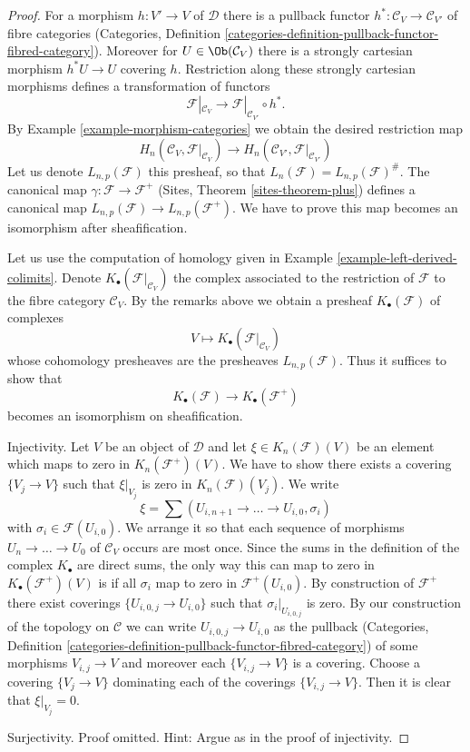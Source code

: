 \begin{proof}
For a morphism $h : V' \to V$ of $\mathcal{D}$ there is a
pullback functor $h^* : \mathcal{C}_V \to \mathcal{C}_{V'}$ of fibre
categories (Categories, Definition
\ref{categories-definition-pullback-functor-fibred-category}).
Moreover for $U \in \Ob(\mathcal{C}_V)$ there is a
strongly cartesian morphism $h^*U \to U$ covering $h$.
Restriction along these strongly cartesian morphisms defines a
transformation of functors
$$
\mathcal{F}|_{\mathcal{C}_V}
\longrightarrow
\mathcal{F}|_{\mathcal{C}_{V'}} \circ h^*.
$$
By Example \ref{example-morphism-categories}
we obtain the desired restriction map
$$
H_n(\mathcal{C}_V, \mathcal{F}|_{\mathcal{C}_V})
\longrightarrow
H_n(\mathcal{C}_{V'}, \mathcal{F}|_{\mathcal{C}_{V'}})
$$
Let us denote $L_{n, p}(\mathcal{F})$ this presheaf, so that
$L_n(\mathcal{F}) = L_{n, p}(\mathcal{F})^\#$.
The canonical map $\gamma : \mathcal{F} \to \mathcal{F}^+$
(Sites, Theorem \ref{sites-theorem-plus})
defines a canonical
map $L_{n, p}(\mathcal{F}) \to L_{n, p}(\mathcal{F}^+)$.
We have to prove this map becomes an isomorphism after sheafification.

\medskip\noindent
Let us use the computation of homology given in
Example \ref{example-left-derived-colimits}. Denote
$K_\bullet(\mathcal{F}|_{\mathcal{C}_V})$ the complex associated to
the restriction of $\mathcal{F}$ to the fibre category $\mathcal{C}_V$.
By the remarks above we obtain a presheaf $K_\bullet(\mathcal{F})$
of complexes
$$
V \longmapsto K_\bullet(\mathcal{F}|_{\mathcal{C}_V})
$$
whose cohomology presheaves are the presheaves $L_{n, p}(\mathcal{F})$.
Thus it suffices to show that
$$
K_\bullet(\mathcal{F}) \longrightarrow K_\bullet(\mathcal{F}^+)
$$
becomes an isomorphism on sheafification.

\medskip\noindent
Injectivity. Let $V$ be an object of $\mathcal{D}$ and let
$\xi \in K_n(\mathcal{F})(V)$ be an element which maps
to zero in $K_n(\mathcal{F}^+)(V)$. We have to show there exists a
covering $\{V_j \to V\}$ such that $\xi|_{V_j}$ is zero in
$K_n(\mathcal{F})(V_j)$. We write
$$
\xi = \sum (U_{i, n + 1} \to \ldots \to U_{i, 0}, \sigma_i)
$$
with $\sigma_i \in \mathcal{F}(U_{i, 0})$. We arrange it so that
each sequence of morphisms $U_n \to \ldots \to U_0$ of $\mathcal{C}_V$
occurs are most once. Since the sums in the definition
of the complex $K_\bullet$ are direct sums, the only way this can map
to zero in $K_\bullet(\mathcal{F}^+)(V)$ is if all $\sigma_i$ map
to zero in $\mathcal{F}^+(U_{i, 0})$. By construction of
$\mathcal{F}^+$ there exist coverings $\{U_{i, 0, j} \to U_{i, 0}\}$
such that $\sigma_i|_{U_{i, 0, j}}$ is zero. By our construction of
the topology on $\mathcal{C}$ we can write $U_{i, 0, j} \to U_{i, 0}$
as the pullback (Categories, Definition
\ref{categories-definition-pullback-functor-fibred-category})
of some morphisms $V_{i, j} \to V$ and moreover each
$\{V_{i, j} \to V\}$ is a covering. Choose a covering
$\{V_j \to V\}$ dominating each of the coverings $\{V_{i, j} \to V\}$.
Then it is clear that $\xi|_{V_j} = 0$.

\medskip\noindent
Surjectivity. Proof omitted. Hint: Argue as in the proof of
injectivity.
\end{proof}

